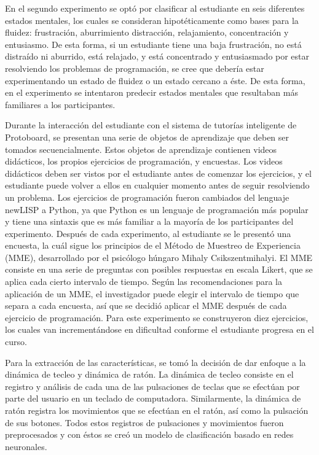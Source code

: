 En el segundo experimento se optó por clasificar al estudiante en seis diferentes estados mentales, los cuales se consideran hipotéticamente como bases para la fluidez: frustración, aburrimiento distracción, relajamiento, concentración y entusiasmo. De esta forma, si un estudiante tiene una baja frustración, no está distraído ni aburrido, está relajado, y está concentrado y entusiasmado por estar resolviendo los problemas de programación, se cree que debería estar experimentando un estado de fluidez o un estado cercano a éste. De esta forma, en el experimento se intentaron predecir estados mentales que resultaban más familiares a los participantes.

Durante la interacción del estudiante con el sistema de tutorías inteligente de Protoboard, se presentan una serie de objetos de aprendizaje que deben ser tomados secuencialmente. Estos objetos de aprendizaje contienen videos didácticos, los propios ejercicios de programación, y encuestas. Los videos didácticos deben ser vistos por el estudiante antes de comenzar los ejercicios, y el estudiante puede volver a ellos en cualquier momento antes de seguir resolviendo un problema. Los ejercicios de programación fueron cambiados del lenguaje newLISP a Python, ya que Python es un lenguaje de programación más popular y tiene una sintaxis que es más familiar a la mayoría de los participantes del experimento. Después de cada experimento, al estudiante se le presentó una encuesta, la cuál sigue los principios de el Método de Muestreo de Experiencia (MME), desarrollado por el psicólogo húngaro Mihaly Csikszentmihalyi. El MME consiste en una serie de preguntas con posibles respuestas en escala Likert, que se aplica cada cierto intervalo de tiempo. Según las recomendaciones para la aplicación de un MME, el investigador puede elegir el intervalo de tiempo que separa a cada encuesta, así que se decidió aplicar el MME después de cada ejercicio de programación. Para este experimento se construyeron diez ejercicios, los cuales van incrementándose en dificultad conforme el estudiante progresa en el curso.

Para la extracción de las características, se tomó la decisión de dar enfoque a la dinámica de tecleo y dinámica de ratón. La dinámica de tecleo consiste en el registro y análisis de cada una de las pulsaciones de teclas que se efectúan por parte del usuario en un teclado de computadora. Similarmente, la dinámica de ratón registra los movimientos que se efectúan en el ratón, así como la pulsación de sus botones. Todos estos registros de pulsaciones y movimientos fueron preprocesados y con éstos se creó un modelo de clasificación basado en redes neuronales.

